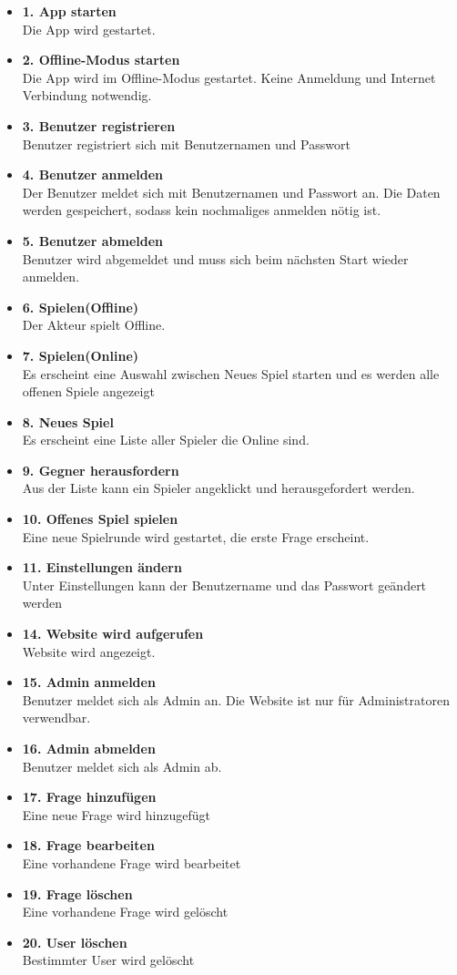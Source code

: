 \documentclass[fontsize=12pt,paper=a4,twoside]{scrartcl}
\begin{document}
\begin{itemize}
	\item \textbf{1. App starten}\\
	Die App wird gestartet. 
	\item \textbf{2. Offline-Modus starten}\\
	Die App wird im Offline-Modus gestartet. Keine Anmeldung und Internet Verbindung notwendig.
	\item \textbf{3. Benutzer registrieren}\\
	Benutzer registriert sich mit Benutzernamen und Passwort
	\item \textbf{4. Benutzer anmelden}\\
	Der Benutzer meldet sich mit Benutzernamen und Passwort an. Die Daten werden gespeichert, sodass kein nochmaliges anmelden nötig ist.
	\item \textbf{5. Benutzer abmelden}\\
	Benutzer wird abgemeldet und muss sich beim nächsten Start wieder anmelden.
	\item \textbf{6. Spielen(Offline)}\\
	Der Akteur spielt Offline.
	\item \textbf{7. Spielen(Online)}\\
	Es erscheint eine Auswahl zwischen Neues Spiel starten
	und es werden alle offenen Spiele angezeigt
	\item \textbf{8. Neues Spiel}\\
	Es erscheint eine Liste aller Spieler die Online sind.
	\item \textbf{9. Gegner herausfordern}\\
	Aus der Liste kann ein Spieler angeklickt und herausgefordert werden.
	\item \textbf{10. Offenes Spiel spielen}\\
	Eine neue Spielrunde wird gestartet, die erste Frage erscheint.
	\item \textbf{11. Einstellungen ändern}\\
	Unter Einstellungen kann der Benutzername und das Passwort geändert werden
	\item \textbf{14. Website wird aufgerufen}\\
	Website wird angezeigt.
	\item \textbf{15. Admin anmelden}\\
	Benutzer meldet sich als Admin an. Die Website ist nur für Administratoren verwendbar.
	\item \textbf{16. Admin abmelden}\\
	Benutzer meldet sich als Admin ab.
	\item \textbf{17. Frage hinzufügen}\\
	Eine neue Frage wird hinzugefügt
	\item \textbf{18. Frage bearbeiten}\\
	Eine vorhandene Frage wird bearbeitet
	\item \textbf{19. Frage löschen}\\
	Eine vorhandene Frage wird gelöscht
	\item \textbf{20. User löschen}\\
	Bestimmter User wird gelöscht
\end{itemize}
\end{document}
